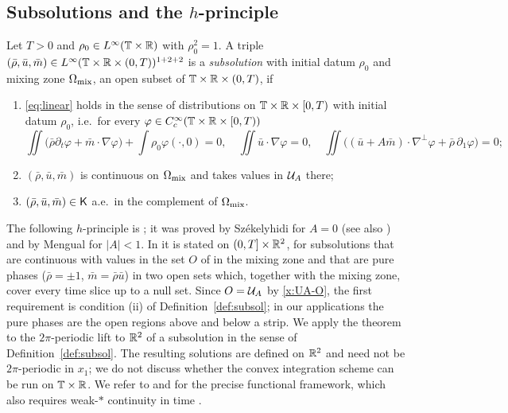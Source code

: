 \subsection{Subsolutions and the $h$-principle}

\begin{definition}\label{def:subsol}
Let $T>0$ and $\rho_0\in L^\infty(\mathbb{T}\times\mathbb{R})$ with $\rho_0^2=1$. A triple $(\bar\rho,\bar u,\bar m)\in L^\infty(\mathbb{T}\times\mathbb{R}\times(0,T))^{1+2+2}$ is a \emph{subsolution} with initial datum $\rho_0$ and
mixing zone $\Omega_{\rm mix}$, an open subset of $\mathbb{T}\times\mathbb{R}\times(0,T)$, if
\begin{enumerate}[label=\textup{(\roman*)}]
\item \eqref{eq:linear} holds in the sense of distributions on $\mathbb{T}\times\mathbb{R}\times[0,T)$ with initial datum $\rho_0$, i.e.\ for every $\varphi\in C^\infty_c(\mathbb{T}\times\mathbb{R}\times[0,T))$
\[
\iint\big(\bar\rho\partial_t\varphi+\bar m\cdot\nabla\varphi\big)+\int\rho_0\varphi(\cdot,0)=0,\quad \iint\bar u\cdot\nabla\varphi=0,\quad \iint\big((\bar u+A\bar m)\cdot\nabla^\perp\varphi+\bar\rho\,\partial_1\varphi\big)=0;
\]
\item $(\bar\rho,\bar u,\bar m)$ is continuous on $\Omega_{\rm mix}$ and takes values in $\mathcal{U}_A$ there;
\item $(\bar\rho,\bar u,\bar m)\in\mathsf{K}$ a.e.\ in the complement of $\Omega_{\rm mix}$.
\end{enumerate}
\end{definition}

The following $h$-principle is \cite[Thm.~2.3]{LM26}; it was proved by Sz\'ekelyhidi \cite{Sze12} for $A=0$ (see also \cite{CFG11,CCF21}) and by Mengual \cite{Men22} for $|A|<1$. In
\cite[Thm.~2.3]{LM26} it is stated on $(0,T]\times\mathbb{R}^2$, for subsolutions that are continuous with values in the set $O$ of \cite{Men22} in the mixing zone and that are pure phases
($\bar\rho=\pm1$, $\bar m=\bar\rho\bar u$) in two open sets which, together with the mixing zone, cover every time slice up to a null set. Since $O=\mathcal{U}_A$ by \eqref{x:UA-O}, the first
requirement is condition (ii) of Definition~\ref{def:subsol}; in our applications the pure phases are the open regions above and below a strip. We apply the theorem to the $2\pi$-periodic
lift to $\mathbb{R}^2$ of a subsolution in the sense of Definition~\ref{def:subsol}. The resulting solutions are defined on $\mathbb{R}^2$ and need not be $2\pi$-periodic in $x_1$; we do not discuss
whether the convex integration scheme can be run on $\mathbb{T}\times\mathbb{R}$. We refer to \cite{Men22} and \cite[Sec.~2]{LM26} for the precise functional framework, which also requires weak-$*$
continuity in time \cite[Def.~2.1]{LM26}.

